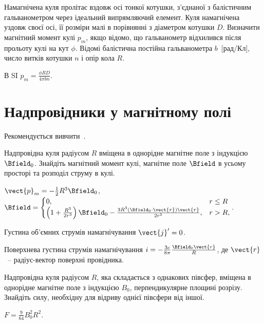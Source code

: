 \begin{problem} %
Намагнічена куля пролітає вздовж осі тонкої котушки, з'єднаної з балістичним гальванометром через ідеальний випрямляючий елемент. Куля намагнічена уздовж своєї осі, її розміри малі в порівнянні з діаметром котушки $D$. Визначити магнітний момент кулі $p_m$, якщо відомо, що гальванометр відхилився після прольоту кулі на кут $\phi$. Відомі балістична постійна гальванометра $b$~[рад/Кл], число витків котушки $n$ і опір кола $R$.
\begin{solution}
	В SI $p_m = \frac{\phi R D}{4\pi b n}$.
\end{solution}
\end{problem}

\section{Надпровідники у магнітному полі}

\begin{Theory}
	Рекомендується вивчити~\cite[\S~80]{Siv3}.
\end{Theory}
\begin{problem}\label{sphere:Superconductor_in_field} %
Надпровідна куля радіусом $R$ вміщена в однорідне магнітне поле з індукцією $\Bfield_0$. Знайдіть магнітний момент кулі, магнітне поле $\Bfield$ в усьому просторі та розподіл струму в кулі.
\begin{solution}
	$\vect{p}_m = - \frac12 R^3\Bfield_0$,
	$
		\Bfield =
		\begin{cases}
			0,                                                                                                & r \le R \\
			\left( 1 + \frac{R^3}{2r^3}\right)\Bfield_0 - \frac{3R^3(\Bfield_0\cdot \vect{r})\vect{r}}{2r^5}, & r > R,
		\end{cases}.
	$

	Густина об'ємних струмів намагнічування $\vect{j}' = 0$.

	Поверхнева густина струмів намагнічування
	$i = -\frac{3c}{8\pi} \frac{\Bfield_0\vect{r}}{R}$,
	де $\vect{r}$~-- радіус-вектор поверхні провідника.
\end{solution}
\end{problem}

\begin{problem}
Надпровідна куля радіусом $R$, яка складається з однакових півсфер, вміщена в однорідне магнітне поле з індукцією $B_0$, перпендикулярне площині розрізу. Знайдіть силу, необхідну для відриву однієї півсфери від іншої.
\begin{solution}
	$F  = \frac{9}{64}B_0^2R^2$.
\end{solution}
\end{problem}

